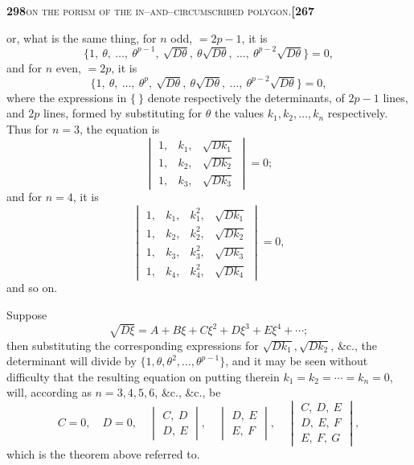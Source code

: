 \documentclass[11pt]{article}
\begin{document}
\newpage
\setcounter{page}{298}

\noindent\textbf{298}\hfill\textsc{on the porism of the in--and--circumscribed polygon.}\hfill\textbf{[267}

\medskip

\noindent or, what is the same thing, for $n$ odd, $= 2p - 1$, it is
\[
   \bigl\{1,\ \theta,\ \ldots,\ \theta^{p-1},\ \sqrt{D\theta},\ \theta\sqrt{D\theta},\ \ldots,\ \theta^{p-2}\sqrt{D\theta}\bigr\} = 0,
\]
and for $n$ even, $= 2p$, it is
\[
   \bigl\{1,\ \theta,\ \ldots,\ \theta^p,\ \sqrt{D\theta},\ \theta\sqrt{D\theta},\ \ldots,\ \theta^{p-2}\sqrt{D\theta}\bigr\} = 0,
\]
where the expressions in $\{\ \}$ denote respectively the determinants, of $2p - 1$ lines, and $2p$ lines, formed by substituting for $\theta$ the values $k_1, k_2, \ldots, k_n$ respectively. Thus for $n = 3$, the equation is
\[
   \begin{vmatrix} 1, & k_1, & \sqrt{D k_1}\\ 1, & k_2, & \sqrt{D k_2}\\ 1, & k_3, & \sqrt{D k_3}\end{vmatrix} = 0;
\]
and for $n = 4$, it is
\[
   \begin{vmatrix} 1, & k_1, & k_1^2, & \sqrt{D k_1}\\ 1, & k_2, & k_2^2, & \sqrt{D k_2}\\ 1, & k_3, & k_3^2, & \sqrt{D k_3}\\ 1, & k_4, & k_4^2, & \sqrt{D k_4}\end{vmatrix} = 0,
\]
and so on.

\medskip

\noindent Suppose
\[
   \sqrt{D\xi} = A + B\xi + C\xi^2 + D\xi^3 + E\xi^4 + \cdots;
\]
then substituting the corresponding expressions for $\sqrt{D k_1}, \sqrt{D k_2}$, \&c., the determinant will divide by $\{1, \theta, \theta^2, \ldots, \theta^{p-1}\}$, and it may be seen without difficulty that the resulting equation on putting therein $k_1 = k_2 = \cdots = k_n = 0$, will, according as $n = 3, 4, 5, 6$, \&c., \&c., be
\[
   C = 0,\quad D = 0,\quad
   \begin{vmatrix} C,\ D\\ D,\ E\end{vmatrix},\quad
   \begin{vmatrix} D,\ E\\ E,\ F\end{vmatrix},\quad
   \begin{vmatrix} C,\ D,\ E\\ D,\ E,\ F\\ E,\ F,\ G\end{vmatrix},
\]
which is the theorem above referred to.
\end{document}
